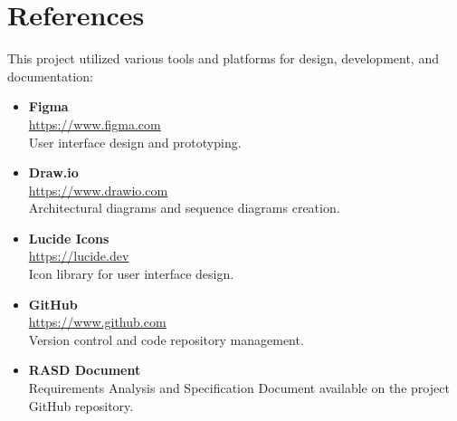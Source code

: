 \chapter{References}

This project utilized various tools and platforms for design, development, and documentation:

\begin{itemize}
    \item \textbf{Figma} \\
    \url{https://www.figma.com} \\
    User interface design and prototyping.
    
    \item \textbf{Draw.io} \\
    \url{https://www.drawio.com} \\
    Architectural diagrams and sequence diagrams creation.
    
    \item \textbf{Lucide Icons} \\
    \url{https://lucide.dev} \\
    Icon library for user interface design.
    
    \item \textbf{GitHub} \\
    \url{https://www.github.com} \\
    Version control and code repository management.
    
    \item \textbf{RASD Document} \\
    Requirements Analysis and Specification Document available on the project GitHub repository.
\end{itemize}